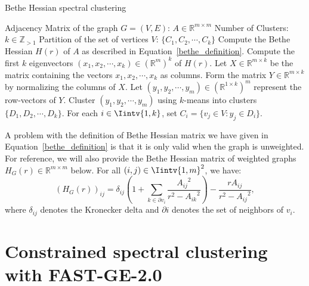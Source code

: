\begin{algorithm}
\caption{Bethe Hessian spectral clustering}\label{bethe_clustering}
\begin{algorithmic}[1]
   \INPUT
      \Statex Adjacency Matrix of the graph $G = (V,E)$: $A \in \mathbb R ^ {m \times m}$ 
      \Statex Number of Clusters: $k \in \mathbb Z_{>1}$
   \OUTPUT
      \Statex Partition of the set of vertices $V$: $\{ C_1, C_2, \cdots, C_k \}$
      \vspace{0.2 cm}
   \State Compute the Bethe Hessian $H(r)$ of $A$ as described in Equation~\vref{bethe_definition}.
   \State Compute the first $k$ eigenvectors $(x_1, x_2, \cdots, x_k) \in (\mathbb R^{m})^k$ of $H(r)$.
   \State Let $X \in \mathbb R^{m \times k}$ be the matrix containing the vectors $x_1, x_2, \cdots, x_k$ as columns.
   \State Form the matrix $Y \in \mathbb R^{m \times k}$ by normalizing the columns of $X$.
   \State Let $(y_1, y_2, \cdots, y_m) \in ( \mathbb R^{1 \times k} )^m$ represent the row-vectors of $Y$.
   \State Cluster $(y_1, y_2, \cdots, y_m)$ using $k$-means into clusters $\{ D_1, D_2, \cdots, D_k \} $.
   \State For each $i \in \Iintv{1,k}$, set $C_i = \{ v_j \in V: y_j \in D_i \}$.
\end{algorithmic}
\end{algorithm}


A problem with the definition of Bethe Hessian matrix we have given in Equation~\vref{bethe_definition} is that it is only valid when the graph is unweighted.
For reference, we will also provide the Bethe Hessian matrix of weighted graphs $H_G(r) \in \mathbb R^{m \times m}$ below. For all $(i,j) \in \Iintv{1,m}^2$, we have:
\begin{equation}
   \left( H_G(r) \right)_{ij} = \delta _{ij} \left( 1 + \sum _{k \in \partial v_i}\frac{{A_{ij}}^2}{r^2 - {A_{ik}}^2} \right) - \frac{r A_{ij}}{r^2 - {A_{ij}}^2},
\end{equation}
where $\delta_{ij}$ denotes the Kronecker delta and $\partial i$ denotes the set of neighbors of $v_i$.



\chapter{Constrained spectral clustering with FAST-GE-2.0}\label{fastge2chapter}


